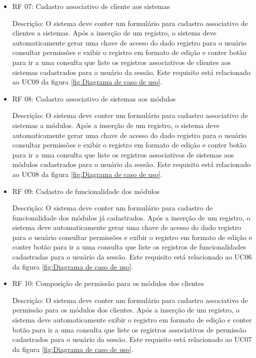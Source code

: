 \begin{itemize}
\item RF 07: Cadastro associativo de cliente aos sistemas


Descrição: O sistema deve conter um formulário para cadastro associativo de clientes a sistemas. Após a inserção de um registro, o sistema deve automaticamente gerar uma chave de acesso do dado registro para o usuário consultar permissões e exibir o registro em formato de edição e conter botão para ir a uma consulta que liste os registros associativos de clientes aos sistemas cadastrados para o usuário da sessão. Este requisito está relacionado ao UC09 da figura \ref{fig:Diagrama de caso de uso}.


\item RF 08: Cadastro associativo de  sistemas aos módulos


Descrição: O sistema deve conter um formulário para cadastro associativo de sistemas a módulos. Após a inserção de um registro, o sistema deve automaticamente gerar uma chave de acesso do dado registro para o usuário consultar permissões e exibir o registro em formato de edição e conter botão para ir a uma consulta que liste os registros associativos de  sistemas aos módulos cadastrados para o usuário da sessão. Este requisito está relacionado ao UC08 da figura \ref{fig:Diagrama de caso de uso}.


\item RF 09: Cadastro de funcionalidade dos módulos


Descrição: O sistema deve conter um formulário para cadastro de funcionalidade dos módulos já cadastrados. Após a inserção de um registro, o sistema deve automaticamente gerar uma chave de acesso do dado registro para o usuário consultar permissões e exibir o registro em formato de edição e conter botão para ir a uma consulta que liste os registros de funcionalidades cadastradas para o usuário da sessão. Este requisito está relacionado ao UC06 da figura \ref{fig:Diagrama de caso de uso}.


\item RF 10: Composição de permissão para os módulos dos clientes


Descrição: O sistema deve conter um formulário para cadastro associativo de permissão para os módulos dos clientes. Após a inserção de um registro, o sistema deve automaticamente exibir o registro em formato de edição e conter botão para ir a uma consulta que liste os registros associativos de permissão cadastrados para o usuário da sessão. Este requisito está relacionado ao UC07 da figura \ref{fig:Diagrama de caso de uso}.



\end{itemize}
